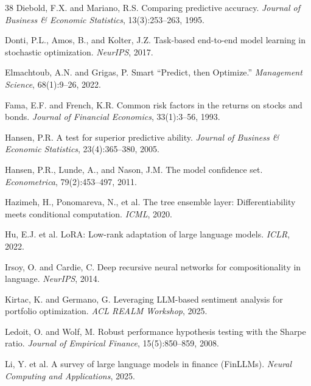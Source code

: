 \documentclass[11pt]{article}
\begin{document}
\begin{thebibliography}{38}
Diebold, F.X. and Mariano, R.S.
\newblock Comparing predictive accuracy.
\newblock \emph{Journal of Business \& Economic Statistics}, 13(3):253--263, 1995.

Donti, P.L., Amos, B., and Kolter, J.Z.
\newblock Task-based end-to-end model learning in stochastic optimization.
\newblock \emph{NeurIPS}, 2017.

Elmachtoub, A.N. and Grigas, P.
\newblock Smart ``Predict, then Optimize.''
\newblock \emph{Management Science}, 68(1):9--26, 2022.

Fama, E.F. and French, K.R.
\newblock Common risk factors in the returns on stocks and bonds.
\newblock \emph{Journal of Financial Economics}, 33(1):3--56, 1993.

Hansen, P.R.
\newblock A test for superior predictive ability.
\newblock \emph{Journal of Business \& Economic Statistics}, 23(4):365--380, 2005.

Hansen, P.R., Lunde, A., and Nason, J.M.
\newblock The model confidence set.
\newblock \emph{Econometrica}, 79(2):453--497, 2011.

Hazimeh, H., Ponomareva, N., et al.
\newblock The tree ensemble layer: Differentiability meets conditional computation.
\newblock \emph{ICML}, 2020.

Hu, E.J. et al.
\newblock LoRA: Low-rank adaptation of large language models.
\newblock \emph{ICLR}, 2022.

Irsoy, O. and Cardie, C.
\newblock Deep recursive neural networks for compositionality in language.
\newblock \emph{NeurIPS}, 2014.

Kirtac, K. and Germano, G.
\newblock Leveraging LLM-based sentiment analysis for portfolio optimization.
\newblock \emph{ACL REALM Workshop}, 2025.

Ledoit, O. and Wolf, M.
\newblock Robust performance hypothesis testing with the Sharpe ratio.
\newblock \emph{Journal of Empirical Finance}, 15(5):850--859, 2008.

Li, Y. et al.
\newblock A survey of large language models in finance (FinLLMs).
\newblock \emph{Neural Computing and Applications}, 2025.


\end{thebibliography}
\end{document}
